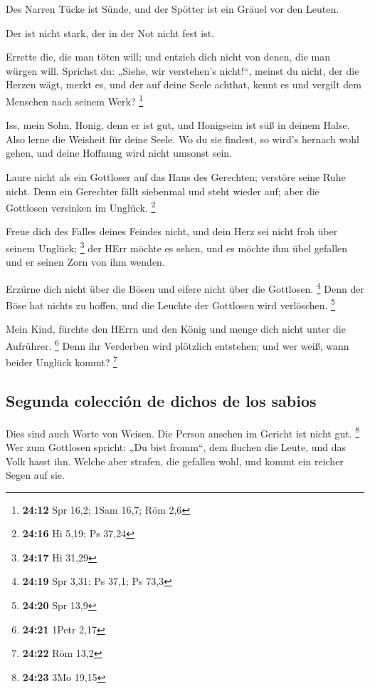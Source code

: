  Des Narren Tücke ist Sünde, und der Spötter ist ein
Gräuel vor den Leuten.

 Der ist nicht stark, der in der Not nicht fest ist.

 Errette die, die man töten will; und entzieh dich nicht
von denen, die man würgen will.  Sprichst du: „Siehe, wir
verstehen's nicht!{}``, meinst du nicht, der die Herzen wägt, merkt es,
und der auf deine Seele achthat, kennt es und vergilt dem Menschen nach
seinem Werk? \footnote{\textbf{24:12} Spr 16,2; 1Sam 16,7; Röm 2,6}

 Iss, mein Sohn, Honig, denn er ist gut, und Honigseim
ist süß in deinem Halse.  Also lerne die Weisheit für
deine Seele. Wo du sie findest, so wird's hernach wohl gehen, und deine
Hoffnung wird nicht umsonst sein.

 Laure nicht als ein Gottloser auf das Haus des
Gerechten; verstöre seine Ruhe nicht.  Denn ein Gerechter
fällt siebenmal und steht wieder auf; aber die Gottlosen versinken im
Unglück. \footnote{\textbf{24:16} Hi 5,19; Ps 37,24}

 Freue dich des Falles deines Feindes nicht, und dein
Herz sei nicht froh über seinem Unglück; \footnote{\textbf{24:17} Hi
  31,29}  der HErr möchte es sehen, und es möchte ihm
übel gefallen und er seinen Zorn von ihm wenden.

 Erzürne dich nicht über die Bösen und eifere nicht über
die Gottlosen. \footnote{\textbf{24:19} Spr 3,31; Ps 37,1; Ps 73,3}
 Denn der Böse hat nichts zu hoffen, und die Leuchte der
Gottlosen wird verlöschen. \footnote{\textbf{24:20} Spr 13,9}

 Mein Kind, fürchte den HErrn und den König und menge
dich nicht unter die Aufrührer. \footnote{\textbf{24:21} 1Petr 2,17}
 Denn ihr Verderben wird plötzlich entstehen; und wer
weiß, wann beider Unglück kommt? \footnote{\textbf{24:22} Röm 13,2}

\hypertarget{segunda-colecciuxf3n-de-dichos-de-los-sabios}{%
\subsection{Segunda colección de dichos de los
sabios}\label{segunda-colecciuxf3n-de-dichos-de-los-sabios}}

 Dies sind auch Worte von Weisen. Die Person ansehen im
Gericht ist nicht gut. \footnote{\textbf{24:23} 3Mo 19,15}
 Wer zum Gottlosen spricht: „Du bist fromm``, dem fluchen
die Leute, und das Volk hasst ihn.  Welche aber strafen,
die gefallen wohl, und kommt ein reicher Segen auf sie.

